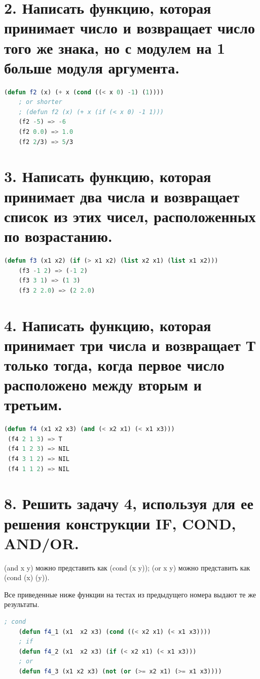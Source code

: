 \documentclass[12pt]{report}
\begin{document}
\section*{2. Написать функцию, которая принимает число и возвращает число того же знака, но с модулем на 1 больше модуля аргумента.}

\begin{lstlisting}[language=Lisp]
	(defun f2 (x) (+ x (cond ((< x 0) -1) (1))))
	; or shorter
	; (defun f2 (x) (+ x (if (< x 0) -1 1)))
	(f2 -5) => -6
	(f2 0.0) => 1.0
	(f2 2/3) => 5/3
\end{lstlisting}


\section*{3. Написать функцию, которая принимает два числа и возвращает список из этих чисел, расположенных по возрастанию.}

\begin{lstlisting}[language=Lisp]
	(defun f3 (x1 x2) (if (> x1 x2) (list x2 x1) (list x1 x2)))
	(f3 -1 2) => (-1 2)
	(f3 3 1) => (1 3)
	(f3 2 2.0) => (2 2.0)
\end{lstlisting}

\section*{4. Написать функцию, которая принимает три числа и возвращает Т только тогда, когда первое число расположено между вторым и третьим.}


\begin{lstlisting}[language=Lisp]
 (defun f4 (x1 x2 x3) (and (< x2 x1) (< x1 x3)))
 (f4 2 1 3) => T
 (f4 1 2 3) => NIL
 (f4 3 1 2) => NIL
 (f4 1 1 2) => NIL
\end{lstlisting}

\section*{8. Решить задачу 4, используя для ее решения конструкции IF, COND, AND/OR.}

(and x y) можно представить как (cond (x y)); (or x y) можно представить как (cond (x) (y)).

Все приведенные ниже функции на тестах из предыдущего номера выдают те же результаты.

\begin{lstlisting}[language=Lisp]
	; cond
	(defun f4_1 (x1  x2 x3) (cond ((< x2 x1) (< x1 x3))))
	; if
	(defun f4_2 (x1  x2 x3) (if (< x2 x1) (< x1 x3)))
	; or 
	(defun f4_3 (x1 x2 x3) (not (or (>= x2 x1) (>= x1 x3))))
\end{lstlisting}
\end{document}
